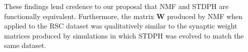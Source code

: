 These findings lend credence to our proposal that \ac{NMF} and \ac{STDPH} 
are functionally equivalent.
Furthermore, the matrix \textbf{W} produced by \ac{NMF} when applied to the \ac{RSC} dataset was qualitatively similar to the synaptic weight matrices produced by 
simulations in which \ac{STDPH} was evolved to match the same dataset.





